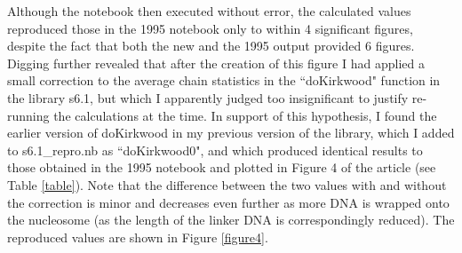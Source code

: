 Although the notebook then executed without error, the calculated values reproduced those in the 1995 notebook only to within 4 significant figures, despite the fact that both the new and the 1995 output provided 6 figures. Digging further revealed that after the creation of this figure I had applied a small correction to the average chain statistics in the ``doKirkwood" function in the library s6.1, but which I apparently judged too insignificant to justify re-running the calculations at the time. In support of this hypothesis, I found the earlier version of doKirkwood in my previous version of the library, which I added to s6.1\_repro.nb as ``doKirkwood0", and which produced identical results to those obtained in the 1995 notebook and plotted in Figure 4 of the article (see Table \ref{table}). Note that the difference between the two values with and without the correction is minor and decreases even further as more DNA is wrapped onto the nucleosome (as the length of the linker DNA is correspondingly reduced). The reproduced values are shown in Figure \ref{figure4}.

